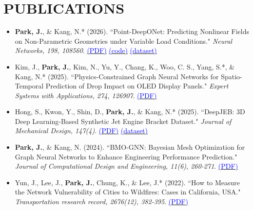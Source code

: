 \documentclass[a4paper,10pt]{article}
\begin{document}
\section*{PUBLICATIONS}
\begin{itemize}[left=0pt]
    \item \textbf{Park, J.}, \& Kang, N.* (2026). “Point-DeepONet: Predicting Nonlinear Fields on Non-Parametric Geometries under Variable Load Conditions." \textit{Neural Networks, 198, 108560}. \href{https://drive.google.com/file/d/1lhtuo7lj0tQHgUiy_O5BtJQ1Z8Z5uwCw/view?usp=sharing}{\textcolor{blue}{(PDF)}} \href{https://github.com/jangseop-park/Point-DeepONet}{\textcolor{blue}{(code)}} \href{https://www.kaggle.com/datasets/jangseop/point-deeponet-dataset}{\textcolor{blue}{(dataset)}}

    \item Kim, J., \textbf{Park, J.}, Kim, N., Yu, Y., Chang, K., Woo, C. S., Yang, S.*, \& Kang, N.* (2025). “Physics-Constrained Graph Neural Networks for Spatio-Temporal Prediction of Drop Impact on OLED Display Panels." \textit{Expert Systems with Applications, 274, 126907}. \href{https://drive.google.com/file/d/19UGsFCe5Sy11yK7XyVSx3SH4UjWmDPvP/view?usp=drive_link}{\textcolor{blue}{(PDF)}}

    \item Hong, S., Kwon, Y., Shin, D., \textbf{Park, J.}, \& Kang, N.* (2025). “DeepJEB: 3D Deep Learning-Based Synthetic Jet Engine Bracket Dataset." \textit{Journal of Mechanical Design, 147(4)}. \href{https://drive.google.com/file/d/17VQTiKB6QXh4zt8W-lwTEPPdEV8HCR40/view?usp=sharing}{\textcolor{blue}{(PDF)}}  \href{https://www.narnia.ai/dataset}{\textcolor{blue}{(dataset)}}

    \item \textbf{Park, J.}, \& Kang, N. (2024). “BMO-GNN: Bayesian Mesh Optimization for Graph Neural Networks to Enhance Engineering Performance Prediction." \textit{Journal of Computational Design and Engineering, 11(6), 260-271}. \href{https://drive.google.com/file/d/1aM3jgCQOcru5nmoYqRsTlN6fyfdzqllY/view?usp=sharing}{\textcolor{blue}{(PDF)}}

    \item Yun, J., Lee, J., \textbf{Park, J.}, Chung, K., \& Lee, J.* (2022). “How to Measure the Network Vulnerability of Cities to Wildfires: Cases in California, USA." \textit{Transportation research record, 2676(12), 382-395}. \href{https://drive.google.com/file/d/1KfCyHU_KTTuBgNK6t3dWyKFuCxVgSrAu/view?usp=sharing}{\textcolor{blue}{(PDF)}}
\end{itemize}
\end{document}
